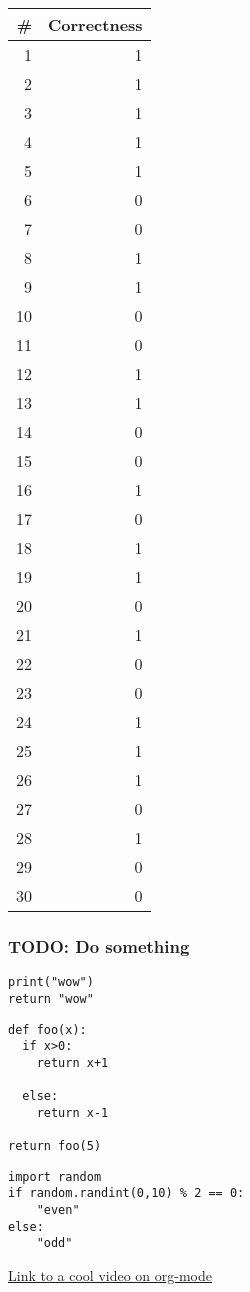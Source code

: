 \documentclass[11pt]{article}
\begin{document}
\begin{center}
\begin{tabular}{rr}
\# & Correctness\\
\hline
1 & 1\\
2 & 1\\
3 & 1\\
4 & 1\\
5 & 1\\
6 & 0\\
7 & 0\\
8 & 1\\
9 & 1\\
10 & 0\\
11 & 0\\
12 & 1\\
13 & 1\\
14 & 0\\
15 & 0\\
16 & 1\\
17 & 0\\
18 & 1\\
19 & 1\\
20 & 0\\
21 & 1\\
22 & 0\\
23 & 0\\
24 & 1\\
25 & 1\\
26 & 1\\
27 & 0\\
28 & 1\\
29 & 0\\
30 & 0\\
\end{tabular}
\end{center}
\subsubsection{TODO: Do something}
\label{sec:org71ca0b7}
\begin{verbatim}
print("wow")
return "wow"
\end{verbatim}

\begin{verbatim}
def foo(x):
  if x>0:
    return x+1

  else:
    return x-1

return foo(5)
\end{verbatim}

\begin{verbatim}
import random
if random.randint(0,10) % 2 == 0:
    "even"
else:
    "odd"
\end{verbatim}

\href{https://www.youtube.com/watch?v=SzA2YODtgK4}{Link to a cool video on org-mode}
\end{document}
